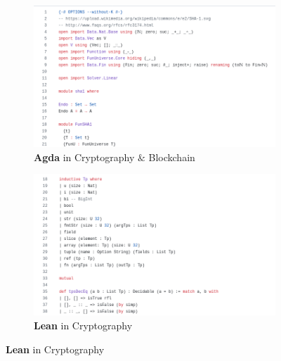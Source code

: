 \documentclass{beamer}
\theoremstyle{definition}
\theoremstyle{remark}
\begin{document}
\begin{frame}
\begin{figure}
		\vspace{0.2cm} %
		\begin{subfigure}[b]{0.45\textwidth}
						\includegraphics[width=\textwidth]{cryptoagda.png}
						\caption{\tiny \textbf{Agda} in Cryptography $\&$ Blockchain}
		\end{subfigure}
		\hspace{0.5cm}
		\begin{subfigure}[b]{0.45\textwidth}
						\includegraphics[width=\textwidth]{rust.png}
						\caption{\tiny \textbf{Lean} in Cryptography}
		\end{subfigure}

\end{figure}
\end{frame}
\end{document}
